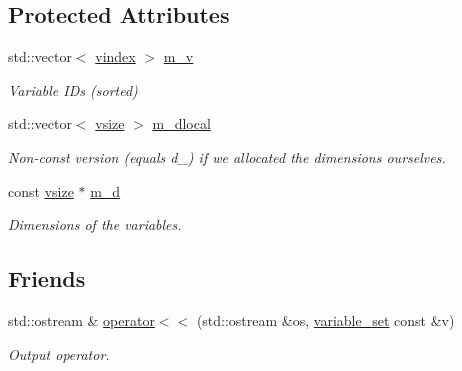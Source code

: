 \subsection*{Protected Attributes}
\begin{DoxyCompactItemize}
\item 
\hypertarget{classmerlin_1_1variable__set_a3d38c96e0a61de6acab828960f708fec}{}std\+::vector$<$ \hyperlink{classmerlin_1_1variable__set_a2dadc030390168fc0656308250716634}{vindex} $>$ \hyperlink{classmerlin_1_1variable__set_a3d38c96e0a61de6acab828960f708fec}{m\+\_\+v}\label{classmerlin_1_1variable__set_a3d38c96e0a61de6acab828960f708fec}

\begin{DoxyCompactList}\small\item\em Variable I\+Ds (sorted) \end{DoxyCompactList}\item 
\hypertarget{classmerlin_1_1variable__set_a163e6b42021ae47f0b03f92bf4f61655}{}std\+::vector$<$ \hyperlink{classmerlin_1_1variable__set_a05d7a8291564fa7fb236a5e9cb65c734}{vsize} $>$ \hyperlink{classmerlin_1_1variable__set_a163e6b42021ae47f0b03f92bf4f61655}{m\+\_\+dlocal}\label{classmerlin_1_1variable__set_a163e6b42021ae47f0b03f92bf4f61655}

\begin{DoxyCompactList}\small\item\em Non-\/const version (equals d\+\_\+) if we allocated the dimensions ourselves. \end{DoxyCompactList}\item 
\hypertarget{classmerlin_1_1variable__set_a0d116bce2d0a762e2d22d3b24c50932e}{}const \hyperlink{classmerlin_1_1variable__set_a05d7a8291564fa7fb236a5e9cb65c734}{vsize} $\ast$ \hyperlink{classmerlin_1_1variable__set_a0d116bce2d0a762e2d22d3b24c50932e}{m\+\_\+d}\label{classmerlin_1_1variable__set_a0d116bce2d0a762e2d22d3b24c50932e}

\begin{DoxyCompactList}\small\item\em Dimensions of the variables. \end{DoxyCompactList}\end{DoxyCompactItemize}
\subsection*{Friends}
\begin{DoxyCompactItemize}
\item 
\hypertarget{classmerlin_1_1variable__set_a6be20cff1abbdcfb247a6278f6a16965}{}std\+::ostream \& \hyperlink{classmerlin_1_1variable__set_a6be20cff1abbdcfb247a6278f6a16965}{operator$<$$<$} (std\+::ostream \&os, \hyperlink{classmerlin_1_1variable__set}{variable\+\_\+set} const \&v)\label{classmerlin_1_1variable__set_a6be20cff1abbdcfb247a6278f6a16965}

\begin{DoxyCompactList}\small\item\em Output operator. \end{DoxyCompactList}\end{DoxyCompactItemize}


